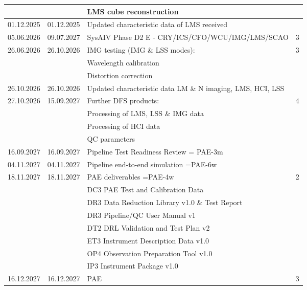 \begin{table}[h!]
\begin{tabularx}{\textwidth}{llll}
    &          & LMS cube reconstruction                                      &	\\
\hline
01.12.2025 & 01.12.2025 &  Updated characteristic data of LMS received		  &   \\
05.06.2026 & 09.07.2027 & SysAIV Phase D2 E - CRY/ICS/CFO/WCU/IMG/LMS/SCAO            &   3 \\
26.06.2026 & 26.10.2026 & IMG testing (IMG \& LSS modes):                     &	3 \\
   &           & Wavelength calibration        	                           & \\   
   &           & Distortion correction                                        & \\
\hline
26.10.2026 & 26.10.2026 & Updated characteristic data LM \& N imaging, LMS, HCI, LSS      & 	\\
\hline
27.10.2026 & 15.09.2027 &	Further DFS products:		                      &	4 \\
    &          &  Processing of LMS, LSS \& IMG data                          &	\\
    &          &  Processing of HCI data                                      &	\\
    &          &  QC parameters					            &	\\
\hline
16.09.2027 & 16.09.2027 & Pipeline Test Readiness Review = PAE-3m			  &	\\
\hline
04.11.2027 & 04.11.2027 & Pipeline end-to-end simulation  =PAE-6w			  &	\\
\hline
18.11.2027 & 18.11.2027 & PAE deliverables =PAE-4w                            &	2 \\
    &          &  DC3 PAE Test and Calibration Data                           &	\\
    &          &  DR3 Data Reduction Library v1.0 \& Test Report              &	\\
    &          &  DR3 Pipeline/QC User Manual v1                              &	\\
    &	       &  DT2 DRL Validation and Test Plan v2                         &	\\
    &      	   &  ET3 Instrument Description Data v1.0                        &	\\
    &   	   &  OP4 Observation Preparation Tool v1.0                       &	\\
    &	   	   &  IP3 Instrument Package v1.0	                			  &	\\
\hline
16.12.2027 & 16.12.2027 & PAE							                      &	3 \\

\end{tabularx}
\end{table}
